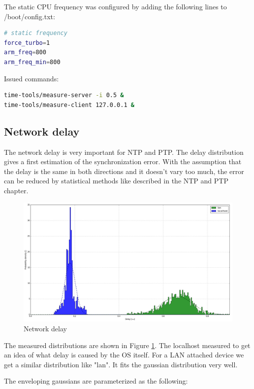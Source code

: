 The static CPU frequency was configured by adding the following lines to /boot/config.txt:
\begin{lstlisting}[language=bash]
# static frequency
force_turbo=1
arm_freq=800
arm_freq_min=800
\end{lstlisting}

Issued commands:

\begin{lstlisting}[language=bash]
time-tools/measure-server -i 0.5 &
time-tools/measure-client 127.0.0.1 &
\end{lstlisting}

\subsection{Network delay}

The network delay is very important for NTP and PTP. The delay distribution gives a first estimation of the synchronization error. With the assumption that the delay is the same in both directions and it doesn't vary too much, the error can be reduced by statistical methods like described in the NTP and PTP chapter.

\begin{figure}[tb]
	\centering
	\includegraphics[width=1.0\textwidth]{figures/plot_network.png}
	\caption{Network delay}
	\label{fig:plot_network}
\end{figure}

The measured distributions are shown in Figure \ref{fig:plot_network}. The localhost measured to get an idea of what delay is caused by the OS itself. For a LAN attached device we get a similar distribution like "lan". It fits the gaussian distribution very well.

The enveloping gaussians are parameterized as the following:

